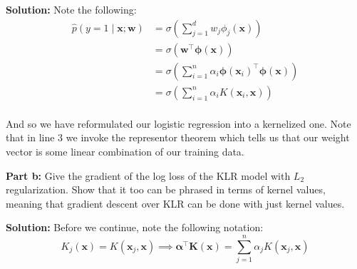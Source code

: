 \documentclass{article}
\renewcommand{\vec}[1]{\mathbf{#1}}
\begin{document}
\noindent\textbf{Solution:} Note the following:
\begin{align*}
  \hat p(y=1\mid\vec x;\vec w)&=\sigma\left(\sum_{j=1}^dw_j\phi_j(\vec x)\right)\tag{logistic regression model}\\
  &=\sigma\left(\vec w^\top\bm\phi(\vec x)\right)\\
  &=\sigma\left(\sum_{i=1}^n\alpha_i\bm\phi(\vec x_i)^\top\bm\phi(\vec x)\right)\tag{representor theorem}\\
  &=\sigma\left(\sum_{i=1}^n\alpha_iK(\vec x_i,\vec x)\right)\tag{def. of kernel}\\
\end{align*}

And so we have reformulated our logistic regression into a kernelized one. Note that in line 3 we invoke the representor theorem which tells us that our weight vector is some linear combination of our training data.
\bigskip

\noindent\textbf{Part b:} Give the gradient of the log loss of the KLR model with $L_2$ regularization. Show that it too can be phrased in terms of kernel values, meaning that gradient descent over KLR can be done with just kernel values.
\bigskip

\noindent\textbf{Solution:} Before we continue, note the following notation:
$$K_j(\vec x)=K(\vec x_j,\vec x)\implies\bm\alpha^\top\vec K(\vec x)=\sum_{j=1}^n\alpha_jK(\vec x_j,\vec x)$$
\end{document}
